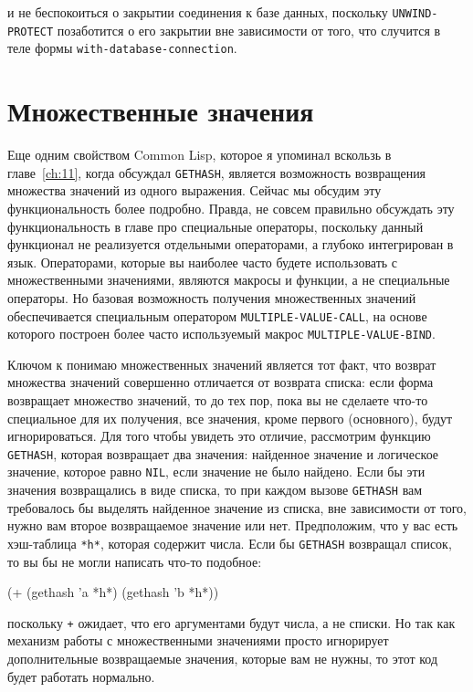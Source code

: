 и не беспокоиться о закрытии соединения к базе данных, поскольку \lstinline{UNWIND-PROTECT}
позаботится о его закрытии вне зависимости от того, что случится в теле формы
\lstinline{with-database-connection}.

\section{Множественные значения}

Еще одним свойством Common Lisp, которое я упоминал вскользь в главе~\ref{ch:11}, когда
обсуждал \lstinline{GETHASH}, является возможность возвращения множества значений из одного
выражения. Сейчас мы обсудим эту функциональность более подробно. Правда, не совсем
правильно обсуждать эту функциональность в главе про специальные операторы, поскольку данный
функционал не реализуется отдельными операторами, а глубоко интегрирован в
язык. Операторами, которые вы наиболее часто будете использовать с множественными
значениями, являются макросы и функции, а не специальные операторы.  Но базовая
возможность получения множественных значений обеспечивается специальным оператором
\lstinline{MULTIPLE-VALUE-CALL}, на основе которого построен более часто используемый макрос
\lstinline{MULTIPLE-VALUE-BIND}.

Ключом к понимаю множественных значений является тот факт, что возврат множества значений
совершенно отличается от возврата списка: если форма возвращает множество значений, то
до тех пор, пока вы не сделаете что-то специальное для их получения, все значения, кроме
первого (основного), будут игнорироваться.  Для того чтобы увидеть это отличие, рассмотрим
функцию \lstinline{GETHASH}, которая возвращает два значения: найденное значение и логическое
значение, которое равно \lstinline{NIL}, если значение не было найдено.  Если бы эти значения
возвращались в виде списка, то при каждом вызове \lstinline{GETHASH} вам требовалось бы
выделять найденное значение из списка, вне зависимости от того, нужно вам второе
возвращаемое значение или нет.  Предположим, что у вас есть хэш-таблица \lstinline{*h*},
которая содержит числа.  Если бы \lstinline{GETHASH} возвращал список, то вы бы не могли
написать что-то подобное:

\begin{myverb}
(+ (gethash 'a *h*) (gethash 'b *h*))
\end{myverb}

\noindent{}поскольку \lstinline{+} ожидает, что его аргументами будут числа, а не
списки. Но так как механизм работы с множественными значениями просто игнорирует
дополнительные возвращаемые значения, которые вам не нужны, то этот код будет работать
нормально.


